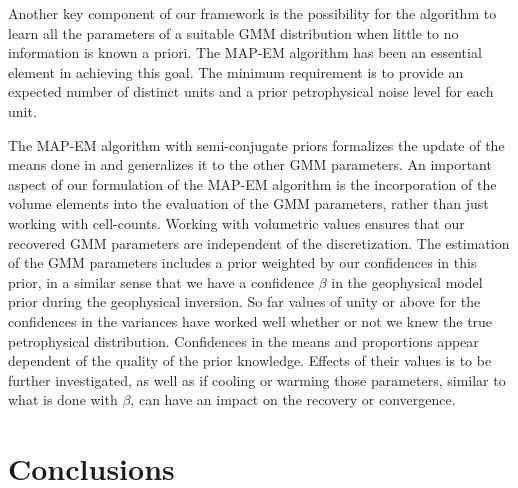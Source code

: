 \documentclass[extra]{gji} %
\begin{document}
Another key component of our framework is the possibility for the algorithm to learn all the parameters of a suitable GMM distribution when little to no information is known a priori. The MAP-EM algorithm has been an essential element in achieving this goal. The minimum requirement is to provide an expected number of distinct units and a prior petrophysical noise level for each unit.

The MAP-EM algorithm with semi-conjugate priors formalizes the update of the means done in \cite{Sun2015} and generalizes it to the other GMM parameters. An important aspect of our formulation of the MAP-EM algorithm is the incorporation of the volume elements into the evaluation of the GMM parameters, rather than just working with cell-counts. Working with volumetric values ensures that our recovered GMM parameters are independent of the discretization. The estimation of the GMM parameters includes a prior weighted by our confidences in this prior, in a similar sense that we have a confidence $\beta$ in the geophysical model prior during the geophysical inversion. So far values of unity or above for the confidences in the variances have worked well whether or not we knew the true petrophysical distribution. Confidences in the means and proportions appear dependent of the quality of the prior knowledge. Effects of their values is to be further investigated, as well as if cooling or warming those parameters, similar to what is done with $\beta$, can have an impact on the recovery or convergence.

\section{Conclusions}
\end{document}
